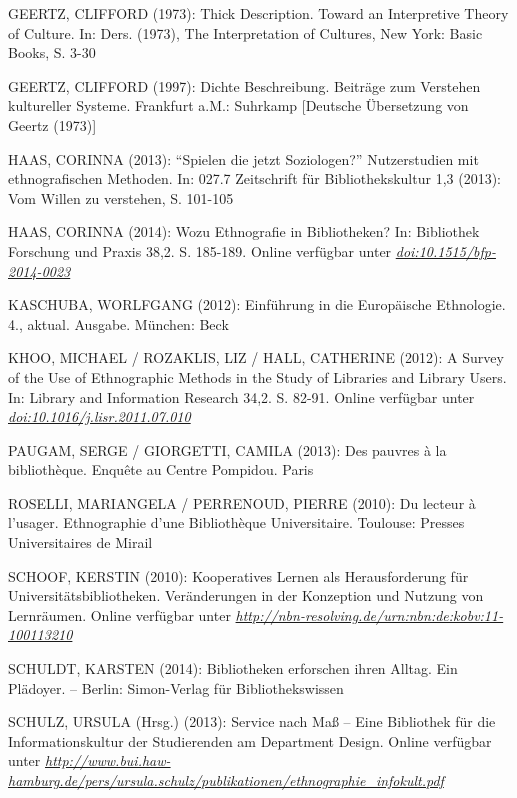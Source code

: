 \documentclass[a4paper,
fontsize=11pt,
oneside,
numbers=noperiodatend,
parskip=half-,
bibliography=totoc,
final
]{scrartcl}
\begin{document}
GEERTZ, CLIFFORD (1973): Thick Description. Toward an Interpretive
Theory of Culture. In: Ders. (1973), The Interpretation of Cultures, New
York: Basic Books, S. 3-30

GEERTZ, CLIFFORD (1997): Dichte Beschreibung. Beiträge zum Verstehen
kultureller Systeme. Frankfurt a.M.: Suhrkamp {[}Deutsche Übersetzung
von Geertz (1973){]}

HAAS, CORINNA (2013): \enquote{Spielen die jetzt Soziologen?}
Nutzerstudien mit ethnografischen Methoden. In: 027.7 Zeitschrift für
Bibliothekskultur 1,3 (2013): Vom Willen zu verstehen, S. 101-105

HAAS, CORINNA (2014): Wozu Ethnografie in Bibliotheken? In: Bibliothek
Forschung und Praxis 38,2. S. 185-189. Online verfügbar unter
\href{http://dx.doi.org/10.1515/bfp-2014-0023}{\emph{doi:10.1515/bfp-2014-0023}}

KASCHUBA, WORLFGANG (2012): Einführung in die Europäische Ethnologie.
4., aktual. Ausgabe. München: Beck

KHOO, MICHAEL / ROZAKLIS, LIZ / HALL, CATHERINE (2012): A Survey of the
Use of Ethnographic Methods in the Study of Libraries and Library Users.
In: Library and Information Research 34,2. S. 82-91. Online verfügbar
unter
\href{http://dx.doi.org/10.1016/j.lisr.2011.07.010}{\emph{doi:10.1016/j.lisr.2011.07.010}}

PAUGAM, SERGE / GIORGETTI, CAMILA (2013): Des pauvres à la bibliothèque.
Enquête au Centre Pompidou. Paris

ROSELLI, MARIANGELA / PERRENOUD, PIERRE (2010): Du lecteur à l'usager.
Ethnographie d'une Bibliothèque Universitaire. Toulouse: Presses
Universitaires de Mirail

SCHOOF, KERSTIN (2010): Kooperatives Lernen als Herausforderung für
Universitätsbibliotheken. Veränderungen in der Konzeption und Nutzung
von Lernräumen. Online verfügbar unter
\href{http://nbn-resolving.de/urn:nbn:de:kobv:11-100113210}{\emph{http://nbn-resolving.de/urn:nbn:de:kobv:11-100113210}}

SCHULDT, KARSTEN (2014): Bibliotheken erforschen ihren Alltag. Ein
Plädoyer. -- Berlin: Simon-Verlag für Bibliothekswissen

SCHULZ, URSULA (Hrsg.) (2013): Service nach Maß -- Eine Bibliothek für
die Informationskultur der Studierenden am Department Design. Online
verfügbar unter
\href{http://www.bui.haw-hamburg.de/pers/ursula.schulz/publikationen/ethnographie_infokult.pdf}{\emph{http://www.bui.haw-hamburg.de/pers/ursula.schulz/publikationen/ethnographie\_infokult.pdf}}
\end{document}

